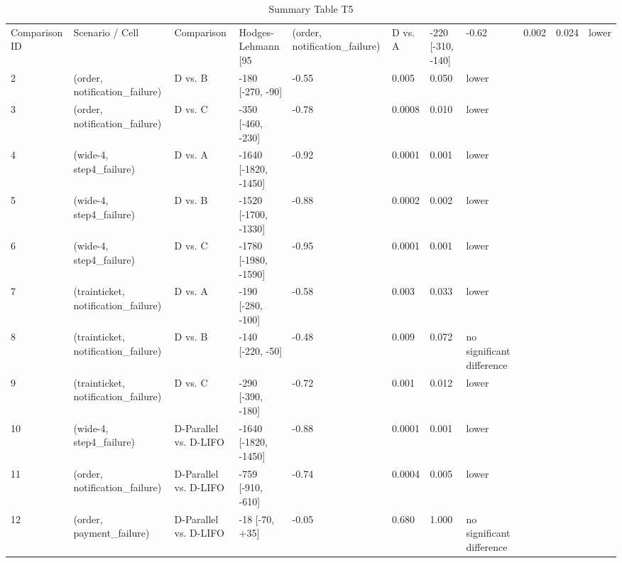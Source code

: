 \begin{table}[htbp]
\centering
\caption{Summary Table T5}
\label{tab:t5}
\begin{tabular}{llllllll}
\toprule
Comparison ID & Scenario / Cell & Comparison & Hodges-Lehmann [95%
 & (order, notification\_failure) & D vs. A & -220 [-310, -140] & -0.62 & 0.002 & 0.024 & lower \\
2 & (order, notification\_failure) & D vs. B & -180 [-270, -90] & -0.55 & 0.005 & 0.050 & lower \\
3 & (order, notification\_failure) & D vs. C & -350 [-460, -230] & -0.78 & 0.0008 & 0.010 & lower \\
4 & (wide-4, step4\_failure) & D vs. A & -1640 [-1820, -1450] & -0.92 & 0.0001 & 0.001 & lower \\
5 & (wide-4, step4\_failure) & D vs. B & -1520 [-1700, -1330] & -0.88 & 0.0002 & 0.002 & lower \\
6 & (wide-4, step4\_failure) & D vs. C & -1780 [-1980, -1590] & -0.95 & 0.0001 & 0.001 & lower \\
7 & (trainticket, notification\_failure) & D vs. A & -190 [-280, -100] & -0.58 & 0.003 & 0.033 & lower \\
8 & (trainticket, notification\_failure) & D vs. B & -140 [-220, -50] & -0.48 & 0.009 & 0.072 & no significant difference \\
9 & (trainticket, notification\_failure) & D vs. C & -290 [-390, -180] & -0.72 & 0.001 & 0.012 & lower \\
10 & (wide-4, step4\_failure) & D-Parallel vs. D-LIFO & -1640 [-1820, -1450] & -0.88 & 0.0001 & 0.001 & lower \\
11 & (order, notification\_failure) & D-Parallel vs. D-LIFO & -759 [-910, -610] & -0.74 & 0.0004 & 0.005 & lower \\
12 & (order, payment\_failure) & D-Parallel vs. D-LIFO & -18 [-70, +35] & -0.05 & 0.680 & 1.000 & no significant difference \\
\bottomrule
\end{tabular}
\end{table}
